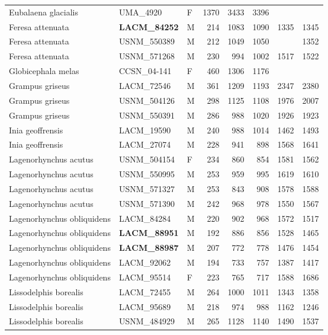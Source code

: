 \begin{table}[ht]
\begin{tabular}{lllrrrrr}
  Eubalaena glacialis & UMA\_4920 & F & 1370 & 3433 & 3396 &  &  \\ 
  Feresa attenuata & \textbf{ LACM\_84252 } & M & 214 & 1083 & 1090 & 1335 & 1345 \\ 
  Feresa attenuata & USNM\_550389 & M & 212 & 1049 & 1050 &  & 1352 \\ 
  Feresa attenuata & USNM\_571268 & M & 230 & 994 & 1002 & 1517 & 1522 \\ 
  Globicephala melas & CCSN\_04-141 & F & 460 & 1306 & 1176 &  &  \\ 
  Grampus griseus & LACM\_72546 & M & 361 & 1209 & 1193 & 2347 & 2380 \\ 
  Grampus griseus & USNM\_504126 & M & 298 & 1125 & 1108 & 1976 & 2007 \\ 
  Grampus griseus & USNM\_550391 & M & 286 & 988 & 1020 & 1926 & 1923 \\ 
  Inia geoffrensis & LACM\_19590 & M & 240 & 988 & 1014 & 1462 & 1493 \\ 
  Inia geoffrensis & LACM\_27074 & M & 228 & 941 & 898 & 1568 & 1641 \\ 
  Lagenorhynchus acutus & USNM\_504154 & F & 234 & 860 & 854 & 1581 & 1562 \\ 
  Lagenorhynchus acutus & USNM\_550995 & M & 253 & 959 & 995 & 1619 & 1610 \\ 
  Lagenorhynchus acutus & USNM\_571327 & M & 253 & 843 & 908 & 1578 & 1588 \\ 
  Lagenorhynchus acutus & USNM\_571390 & M & 242 & 968 & 978 & 1550 & 1567 \\ 
  Lagenorhynchus obliquidens & LACM\_84284 & M & 220 & 902 & 968 & 1572 & 1517 \\ 
  Lagenorhynchus obliquidens & \textbf{ LACM\_88951 } & M & 192 & 886 & 856 & 1528 & 1465 \\ 
  Lagenorhynchus obliquidens & \textbf{ LACM\_88987 } & M & 207 & 772 & 778 & 1476 & 1454 \\ 
  Lagenorhynchus obliquidens & LACM\_92062 & M & 194 & 733 & 757 & 1387 & 1417 \\ 
  Lagenorhynchus obliquidens & LACM\_95514 & F & 223 & 765 & 717 & 1588 & 1686 \\ 
  Lissodelphis borealis & LACM\_72455 & M & 264 & 1000 & 1011 & 1343 & 1358 \\ 
  Lissodelphis borealis & LACM\_95689 & M & 218 & 974 & 988 & 1162 & 1246 \\ 
  Lissodelphis borealis & USNM\_484929 & M & 265 & 1128 & 1140 & 1490 & 1537 \\ 

\end{tabular}
\end{table}
